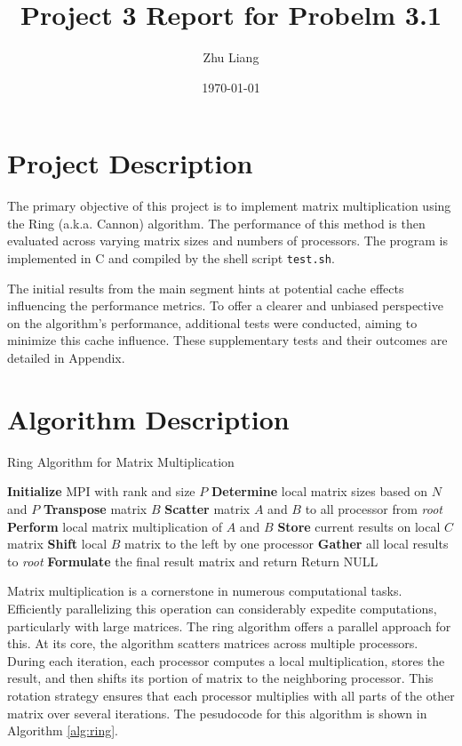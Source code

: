 \documentclass[12pt,a4paper]{article}
\title{Project 3 Report for Probelm 3.1}
\author{Zhu Liang}
\date{\today}
\begin{document}
\maketitle

\section{Project Description}
The primary objective of this project is to implement matrix multiplication using the Ring (a.k.a. Cannon)
 algorithm.
The performance of this method is then evaluated across varying matrix sizes and numbers of processors.
The program is implemented in C and compiled by the shell script \texttt{test.sh}.

The initial results from the main segment hints at potential cache effects influencing the performance metrics. 
To offer a clearer and unbiased perspective on the algorithm's performance, additional tests were conducted, 
aiming to minimize this cache influence. 
These supplementary tests and their outcomes are detailed in Appendix.



\section{Algorithm Description}
\begin{algorithm}[htbp]
    \caption{Ring Algorithm for Matrix Multiplication}
    \label{alg:ring}
    \begin{algorithmic}[1]
    \State \textbf{Initialize} MPI with rank and size $P$
    \State \textbf{Determine} local matrix sizes based on $N$ and $P$
    \State \textbf{Transpose} matrix $B$
    \State \textbf{Scatter} matrix $A$ and $B$ to all processor from \textit{root}
        \State \textbf{Perform} local matrix multiplication of $A$ and $B$
        \State \textbf{Store} current results on local $C$ matrix
        \State \textbf{Shift} local $B$ matrix to the left by one processor
    \EndFor
    \State \textbf{Gather} all local results to \textit{root}
        \State \textbf{Formulate} the final result matrix and return
    \Else
        \State Return NULL
    \EndIf
    \EndProcedure
    \end{algorithmic}
\end{algorithm}


Matrix multiplication is a cornerstone in numerous computational tasks. 
Efficiently parallelizing this operation can considerably expedite computations,  
 particularly with large matrices. The ring algorithm offers a parallel approach for this. 
At its core, the algorithm scatters matrices across multiple processors. 
During each iteration, each processor computes a local multiplication, 
stores the result, and then shifts its portion of matrix to the neighboring processor. 
This rotation strategy ensures that each processor multiplies with all parts 
 of the other matrix over several iterations. 
The pesudocode for this algorithm is shown in Algorithm \ref{alg:ring}.
\end{document}

